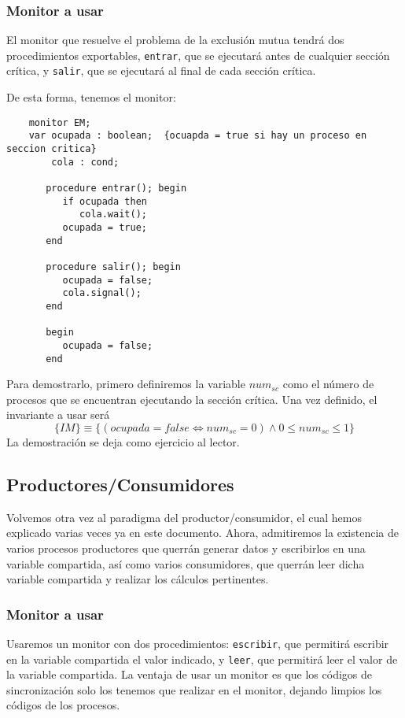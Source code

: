 \subsubsection{Monitor a usar}
El monitor que resuelve el problema de la exclusión mutua tendrá dos procedimientos exportables, \verb|entrar|, que se ejecutará antes de cualquier sección crítica, y \verb|salir|, que se ejecutará al final de cada sección crítica.

De esta forma, tenemos el monitor:
\begin{verbatim}
    monitor EM;
    var ocupada : boolean;  {ocuapda = true si hay un proceso en seccion critica}
        cola : cond;

       procedure entrar(); begin
          if ocupada then
             cola.wait();
          ocupada = true;
       end

       procedure salir(); begin
          ocupada = false;
          cola.signal();
       end

       begin
          ocupada = false;
       end
\end{verbatim}
Para demostrarlo, primero definiremos la variable $num_{sc}$ como el número de procesos que se encuentran ejecutando la sección crítica. Una vez definido, el invariante a usar será
\begin{equation*}
    \{IM\} \equiv \{(ocupada = false \Longleftrightarrow num_{sc} = 0) \land 0\leq num_{sc} \leq 1\}
\end{equation*}
La demostración se deja como ejercicio al lector.

\subsection{Productores/Consumidores}
Volvemos otra vez al paradigma del productor/consumidor, el cual hemos explicado varias veces ya en este documento. Ahora, admitiremos la existencia de varios procesos productores que querrán generar datos y escribirlos en una variable compartida, así como varios consumidores, que querrán leer dicha variable compartida y realizar los cálculos pertinentes.

\subsubsection{Monitor a usar}
Usaremos un monitor con dos procedimientos: \verb|escribir|, que permitirá escribir en la variable compartida el valor indicado, y \verb|leer|, que permitirá leer el valor de la variable compartida. La ventaja de usar un monitor es que los códigos de sincronización solo los tenemos que realizar en el monitor, dejando limpios los códigos de los procesos.

